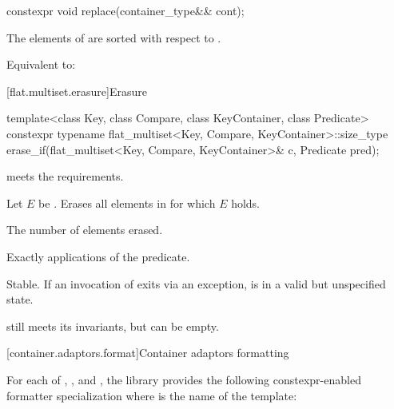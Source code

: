 %
\begin{itemdecl}
constexpr void replace(container_type&& cont);
\end{itemdecl}

\begin{itemdescr}
\pnum
\expects
The elements of  are sorted with respect to .

\pnum
\effects
Equivalent to: 
\end{itemdescr}

[flat.multiset.erasure]{Erasure}

%
\begin{itemdecl}
template<class Key, class Compare, class KeyContainer, class Predicate>
  constexpr typename flat_multiset<Key, Compare, KeyContainer>::size_type
    erase_if(flat_multiset<Key, Compare, KeyContainer>& c, Predicate pred);
\end{itemdecl}

\begin{itemdescr}
\pnum
\expects
{} meets the  requirements.

\pnum
\effects
Let $E$ be .
Erases all elements  in  for which $E$ holds.

\pnum
\returns
The number of elements erased.

\pnum
\complexity
Exactly  applications of the predicate.

\pnum
\remarks
Stable.
If an invocation of  exits via an exception,
 is in a valid but unspecified state.
\begin{note}
 still meets its invariants, but can be empty.
\end{note}
\end{itemdescr}

[container.adaptors.format]{Container adaptors formatting}

\pnum
For each of
,
, and
,
the library provides the following constexpr-enabled formatter specialization
where  is the name of the template:

